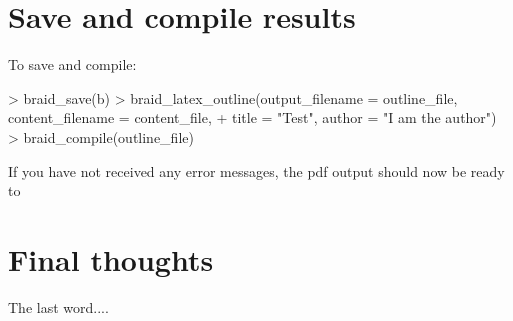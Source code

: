 \documentclass[a4paper]{article}
\begin{document}
\section{Save and compile results}

To save and compile:

\begin{Schunk}
\begin{Sinput}
> braid_save(b)
> braid_latex_outline(output_filename = outline_file, content_filename = content_file, 
+     title = "Test", author = "I am the author")
> braid_compile(outline_file)
\end{Sinput}
\end{Schunk}

If you have not received any error messages, the pdf output should now be ready to 


\section{Final thoughts}

The last word....


\end{document}
